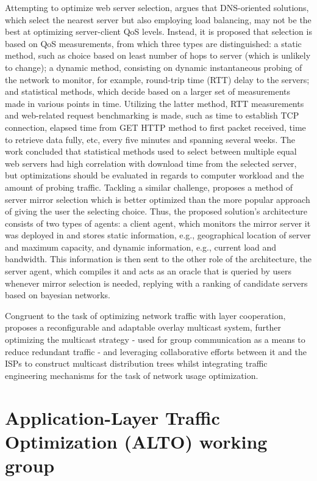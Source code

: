 \documentclass[
  oneside,
  11pt, a4paper,
  footinclude=true,
  headinclude=true,
  cleardoublepage=empty
]{scrbook}
\begin{document}
	Attempting to optimize web server selection, \cite{kenichi} argues that DNS-oriented solutions, which select the nearest server but also employing load balancing, may not be the best at optimizing server-client QoS levels. Instead, it is proposed that selection is based on QoS measurements, from which three types are distinguished: a static method, such as choice based on least number of hops to server (which is unlikely to change); a dynamic method, consisting on dynamic instantaneous probing of the network to monitor, for example, round-trip time (RTT) delay to the servers; and statistical methods, which decide based on a larger set of measurements made in various points in time. Utilizing the latter method, RTT measurements and web-related request benchmarking is made, such as time to establish TCP connection, elapsed time from GET HTTP method to first packet received, time to retrieve data fully, etc, every five minutes and spanning several weeks. The work concluded that statistical methods used to select between multiple equal web servers had high correlation with download time from the selected server, but optimizations should be evaluated in regards to computer workload and the amount of probing traffic. Tackling a similar challenge, \cite{swain} proposes a method of server mirror selection which is better optimized than the more popular approach of giving the user the selecting choice. Thus, the proposed solution's architecture consists of two types of agents: a client agent, which monitors the mirror server it was deployed in and stores static information, e.g., geographical location of server and maximum capacity, and dynamic information, e.g., current load and bandwidth. This information is then sent to the other role of the architecture, the server agent, which compiles it and acts as an oracle that is queried by users whenever mirror selection is needed, replying with a ranking of candidate servers based on bayesian networks. 
	
	Congruent to the task of optimizing network traffic with layer cooperation, \cite{adaptable-overlay} proposes a reconfigurable and adaptable overlay multicast system, further optimizing the multicast strategy - used for group communication as a means to reduce redundant traffic - and leveraging collaborative efforts between it and the ISPs to construct multicast distribution trees whilst integrating traffic engineering mechanisms for the task of network usage optimization.

	\section{Application-Layer Traffic Optimization (ALTO) working group}
	
\end{document}
